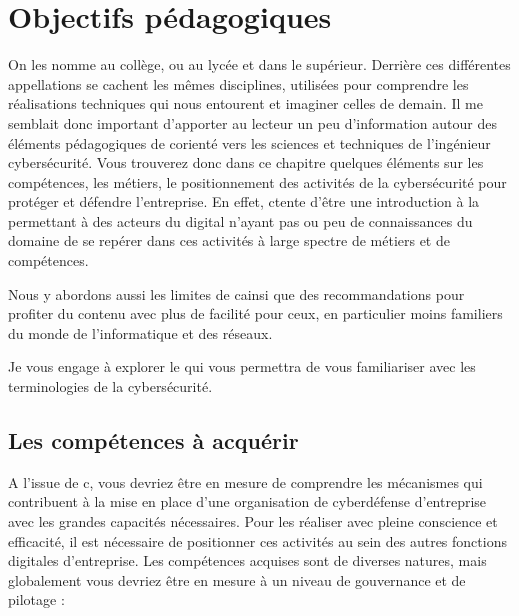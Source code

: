 %
%
 
\section{Objectifs pédagogiques}

On les nomme  au collège,  ou  au lycée et dans le supérieur. Derrière ces différentes appellations se cachent les mêmes disciplines, utilisées pour comprendre les réalisations techniques qui nous entourent et imaginer celles de demain.
Il me semblait donc important d'apporter au lecteur un peu d'information autour des éléments pédagogiques de c\ecours  orienté vers les sciences et techniques de l'ingénieur cybersécurité. Vous trouverez donc dans ce chapitre quelques éléments sur les compétences, les métiers, le positionnement des activités de la cybersécurité pour protéger et défendre  l'entreprise.
En effet, c\ecours tente d'être une introduction à la \etitle permettant à des acteurs du digital n'ayant pas ou peu de connaissances du domaine de se repérer dans ces activités à large spectre de métiers et de compétences.


Nous y abordons aussi les limites de c\ecours ainsi que des recommandations pour profiter du contenu avec plus de facilité pour ceux, en particulier moins familiers du monde de l'informatique et des réseaux.

Je vous engage à explorer le   qui vous permettra de vous familiariser avec les terminologies de la cybersécurité.

\subsection{Les compétences à acquérir}
A l'issue de c\ecours, vous devriez être en mesure de comprendre les mécanismes qui contribuent à la mise en place d'une organisation de cyberdéfense d'entreprise avec les grandes capacités nécessaires. Pour les réaliser avec pleine conscience et efficacité, il est nécessaire de positionner ces activités au sein des autres fonctions digitales  d'entreprise. Les compétences acquises sont de diverses natures, mais globalement vous devriez être en mesure à un niveau de gouvernance et de pilotage  :  

